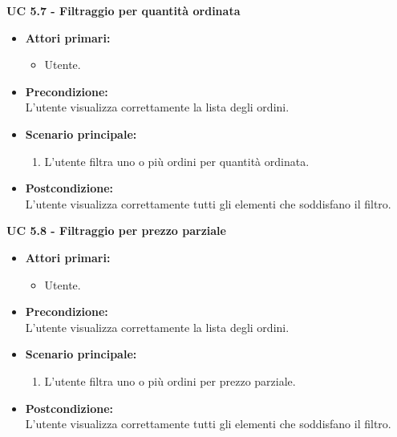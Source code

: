 \vspace{0.5cm}

\noindent \textbf{\large UC 5.7 - Filtraggio per quantità ordinata}
\label{uc:filtraggio-quantita-ordinata}
\begin{itemize}

	\item \textbf{Attori primari: }
		\begin{itemize}
			\item Utente.
		\end{itemize}

	\item \textbf{Precondizione: }\\[0.3cm]
		L'utente visualizza correttamente la lista degli ordini.

	\item \textbf{Scenario principale: }
		\begin{enumerate}
			\item L'utente filtra uno o più ordini per quantità ordinata.
		\end{enumerate}
		

	\item \textbf{Postcondizione: }\\[0.3cm]
		L'utente visualizza correttamente tutti gli elementi che soddisfano il filtro.

\end{itemize}

\vspace{0.5cm}

\noindent \textbf{\large UC 5.8 - Filtraggio per prezzo parziale}
\label{uc:filtraggio-prezzo-parziale-ord}
\begin{itemize}

	\item \textbf{Attori primari: }
		\begin{itemize}
			\item Utente.
		\end{itemize}

	\item \textbf{Precondizione: }\\[0.3cm]
		L'utente visualizza correttamente la lista degli ordini.

	\item \textbf{Scenario principale: }
		\begin{enumerate}
			\item L'utente filtra uno o più ordini per prezzo parziale.
		\end{enumerate}
		

	\item \textbf{Postcondizione: }\\[0.3cm]
		L'utente visualizza correttamente tutti gli elementi che soddisfano il filtro.

\end{itemize}

